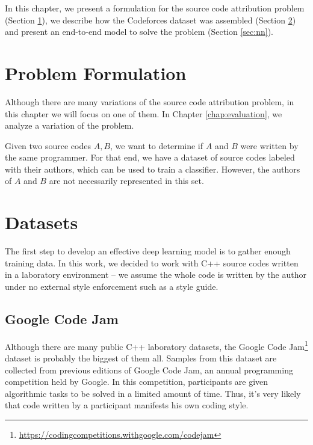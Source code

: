 \label{chap:methodology}

In this chapter, we present a formulation for the source code attribution problem (Section \ref{sec:formulation}), we describe how the Codeforces dataset was assembled (Section \ref{sec:dataset}) and present an end-to-end model to solve the problem (Section \ref{sec:nn}).

\section{Problem Formulation}\label{sec:formulation}

Although there are many variations of the source code attribution problem, in this chapter we will focus on one of them. In Chapter \ref{chap:evaluation}, we analyze a variation of the problem.

Given two source codes $A, B$, we want to determine if $A$ and $B$ were written by the same programmer. For that end, we have a dataset of source codes labeled with their authors, which can be used to train a classifier. However, the authors of $A$ and $B$ are not necessarily represented in this set.

\section{Datasets}\label{sec:dataset}

The first step to develop an effective deep learning model is to gather enough training data. In this work, we decided to work with C++ source codes written in a laboratory environment -- we assume the whole code is written by the author under no external style enforcement such as a style guide.

\subsection{Google Code Jam}

Although there are many public C++ laboratory datasets, the Google Code Jam\footnote{\url{https://codingcompetitions.withgoogle.com/codejam}} dataset \cite{caliskan_2015} is probably the biggest of them all. Samples from this dataset are collected from previous editions of Google Code Jam, an annual programming competition held by Google. In this competition, participants are given algorithmic tasks to be solved in a limited amount of time. Thus, it's very likely that code written by a participant manifests his own coding style.


